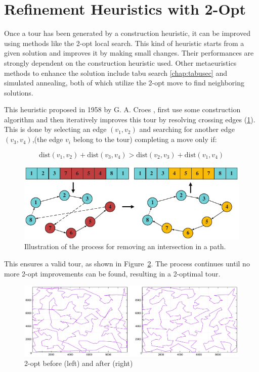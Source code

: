 \section{Refinement Heuristics with 2-Opt}
Once a tour has been generated by a construction heuristic, it can be improved using methods like the 2-opt local search. This kind of heuristic starts from a given solution and improves it by making small changes. Their performances are strongly dependent on the construction heuristic used. Other metaeuristics methods to enhance the solution include tabu search \ref{chap:tabusec} and simulated annealing, both of which utilize the 2-opt move to find neighboring solutions.

This heuristic proposed in 1958 by G. A. Croes \cite{2opt}, first use some construction algorithm and then iteratively improves this tour by resolving crossing edges (\ref{fig:crossing_edge}). This is done by selecting an edge \((v_1, v_2)\) and searching for another edge \((v_3, v_4)\),(the edge \(v_{i}\) belong to the tour) completing a move only if:

\[ \text{dist}(v_1, v_2) + \text{dist}(v_3, v_4) > \text{dist}(v_2, v_3) + \text{dist}(v_1, v_4) \]

\begin{figure}[H]
    \centering
    \includegraphics[width=0.9\linewidth]{Immagini/Crossing edges.pdf}
    \caption{Illustration of the process for removing an intersection in a path.}
    \label{fig:crossing_edge}
\end{figure}

This ensures a valid tour, as shown in Figure~\ref{fig:2opt_before_after}. The process continues until no more 2-opt improvements can be found, resulting in a 2-optimal tour. \\

\begin{figure}[H]
    \centering
    \includegraphics[width=\linewidth]{Immagini/NN+2opt.pdf}
    \caption{2-opt before (left) and after (right)}
    \label{fig:2opt_before_after}
\end{figure}

